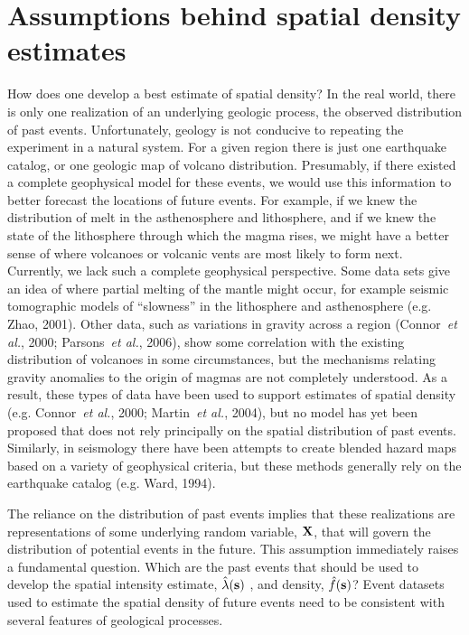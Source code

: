 \documentclass[10pt]{article}
\begin{document}
\section{ Assumptions behind spatial density estimates }
How does one develop a best estimate of spatial density? In the real world, there is only one realization of an underlying geologic process, the observed distribution of past events. Unfortunately, geology is not conducive to repeating the experiment in a natural system. For a given region there is just one earthquake catalog, or one geologic map of volcano distribution. Presumably, if there existed a complete geophysical model for these events, we would use this information to better forecast the locations of future events. For example, if we knew the distribution of melt in the asthenosphere and lithosphere, and if we knew the state of the lithosphere through which the magma rises, we might have a better sense of where volcanoes or volcanic vents are most likely to form next. Currently, we lack such a complete geophysical perspective. Some data sets give an idea of where partial melting of the mantle might occur, for example seismic tomographic models of ``slowness'' in the lithosphere and asthenosphere (e.g. Zhao, 2001). Other data, such as variations in gravity across a region (Connor~{\it et al.}, 2000; Parsons~{\it et al.}, 2006), show some correlation with the existing distribution of volcanoes in some circumstances, but the mechanisms relating gravity anomalies to the origin of magmas are not completely understood. As a result, these types of data have been used to support estimates of spatial density (e.g. Connor~{\it et al.}, 2000; Martin~{\it et al.}, 2004), but no model has yet been proposed that does not rely principally on the spatial distribution of past events. Similarly, in seismology there have been attempts to create blended hazard maps  based on a variety of geophysical criteria, but these methods generally rely on the earthquake catalog (e.g. Ward, 1994). 

The reliance on the distribution of past events implies that these realizations are representations of some underlying random variable, $\bf{X}$, that will govern the distribution of potential events in the future. This assumption immediately raises a fundamental question. Which are the past events that should be used to develop the spatial intensity estimate, $\hat\lambda(\bf{s})$ , and density, $\hat f(\bf{s})$? Event datasets used to estimate the spatial density of future events need to be consistent with several features of geological processes.
\end{document}
